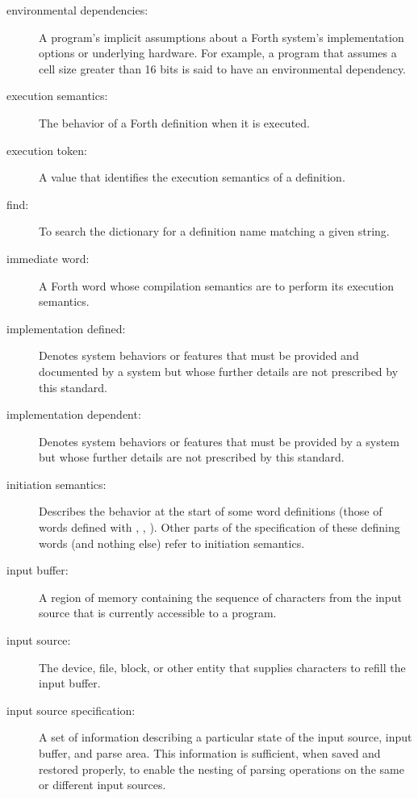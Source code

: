 \begin{description}
\item[environmental dependencies:]
	A program's implicit assumptions about a Forth system's
	implementation options or underlying hardware. For example,
	a program that assumes a cell size greater than 16 bits is
	said to have an environmental dependency.

\item[execution semantics:]
	The behavior of a Forth definition when it is executed.

\item[execution token:]
	A value that identifies the execution semantics of a definition.

\item[find:]
	To search the dictionary for a definition name matching a given
	string.

\item[immediate word:]
	A Forth word whose compilation semantics are to perform its
	execution semantics.

\item[implementation defined:]
	Denotes system behaviors or features that must be provided and
	documented by a system but whose further details are not prescribed
	by this standard.

\item[implementation dependent:]
	Denotes system behaviors or features that must be provided by a
	system but whose further details are not prescribed by this standard.

\item[initiation semantics:]
	Describes the behavior at the start of some word definitions (those
	of words defined with \word{:}, , 
	).  Other parts of the specification of these defining
	words (and nothing else) refer to initiation semantics.

\item[input buffer:]
	A region of memory containing the sequence of characters from the
	input source that is currently accessible to a program.

\item[input source:]
	The device, file, block, or other entity that supplies characters
	to refill the input buffer.

\item[input source specification:]
	A set of information describing a particular state of the input
	source, input buffer, and parse area. This information is
	sufficient, when saved and restored properly, to enable the nesting
	of parsing operations on the same or different input sources.


\end{description}
